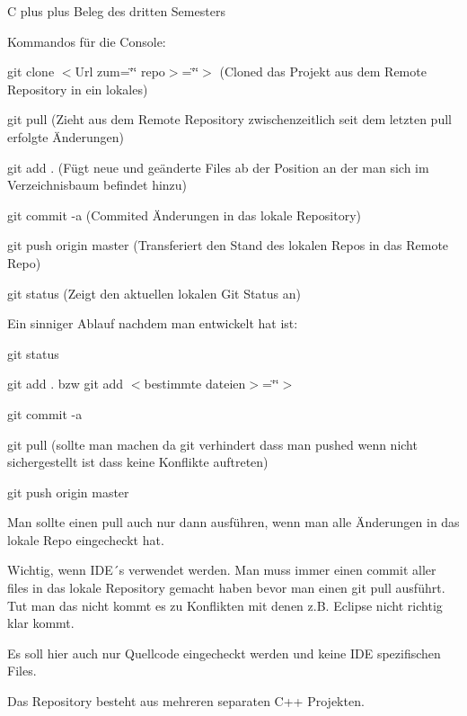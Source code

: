 C plus plus Beleg des dritten Semesters

Kommandos für die Console\-:


\begin{DoxyItemize}
\item git clone $<$\-Url zum=\char`\"{}\char`\"{} repo$>$=\char`\"{}\char`\"{}$>$ (Cloned das Projekt aus dem Remote Repository in ein lokales)
\item git pull (Zieht aus dem Remote Repository zwischenzeitlich seit dem letzten pull erfolgte Änderungen)
\item git add . (Fügt neue und geänderte Files ab der Position an der man sich im Verzeichnisbaum befindet hinzu)
\item git commit -\/a (Commited Änderungen in das lokale Repository)
\item git push origin master (Transferiert den Stand des lokalen Repos in das Remote Repo)
\item git status (Zeigt den aktuellen lokalen Git Status an)
\end{DoxyItemize}

Ein sinniger Ablauf nachdem man entwickelt hat ist\-:
\begin{DoxyItemize}
\item git status
\item git add . bzw git add $<$bestimmte dateien$>$=\char`\"{}\char`\"{}$>$
\item git commit -\/a
\item git pull (sollte man machen da git verhindert dass man pushed wenn nicht sichergestellt ist dass keine Konflikte auftreten)
\item git push origin master
\end{DoxyItemize}

Man sollte einen pull auch nur dann ausführen, wenn man alle Änderungen in das lokale Repo eingecheckt hat.

Wichtig, wenn I\-D\-E´s verwendet werden. Man muss immer einen commit aller files in das lokale Repository gemacht haben bevor man einen git pull ausführt. Tut man das nicht kommt es zu Konflikten mit denen z.\-B. Eclipse nicht richtig klar kommt.

Es soll hier auch nur Quellcode eingecheckt werden und keine I\-D\-E spezifischen Files.

Das Repository besteht aus mehreren separaten C++ Projekten.


